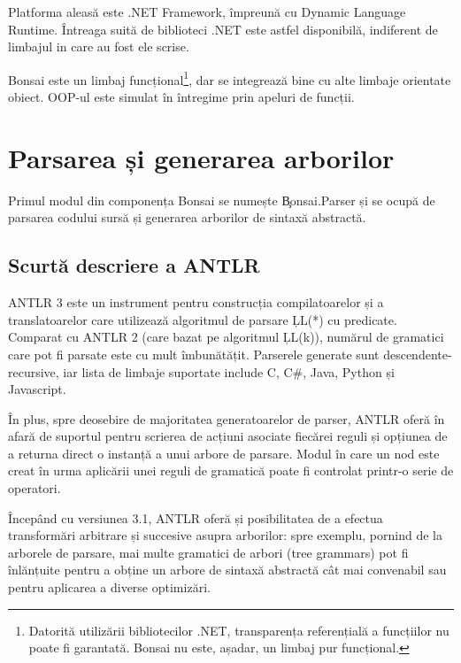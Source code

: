 \documentclass[12pt,a4paper]{memoir}
\begin{document}
Platforma aleasă este .NET Framework, împreună cu Dynamic Language Runtime. Întreaga suită de biblioteci .NET este astfel disponibilă, indiferent de limbajul in care au fost ele scrise. 

Bonsai este un limbaj funcțional\footnote{Datorită utilizării bibliotecilor .NET, transparența referențială a funcțiilor nu poate fi garantată. Bonsai nu este, așadar, un limbaj pur funcțional.}, dar se integrează bine cu alte limbaje orientate obiect. OOP-ul este simulat în întregime prin apeluri de funcții.

\chapter{Parsarea și generarea arborilor}

Primul modul din componența Bonsai se numește \c{Bonsai.Parser} și se ocupă de parsarea codului sursă și generarea arborilor de sintaxă abstractă.

\section{Scurtă descriere a ANTLR}

ANTLR 3\cite{antlr} este un instrument pentru construcția compilatoarelor și a translatoarelor care utilizează algoritmul de parsare \c{LL(*)} cu predicate\cite{definitive_antlr_reference}. Comparat cu ANTLR 2 (care bazat pe algoritmul \c{LL(k)}), numărul de gramatici care pot fi parsate este cu mult îmbunătățit. Parserele generate sunt descendente-recursive, iar lista de limbaje suportate\cite{antlr_targets} include C, C\#, Java, Python și Javascript. 

În plus, spre deosebire de majoritatea generatoarelor de parser, ANTLR oferă în afară de suportul pentru scrierea de acțiuni asociate fiecărei reguli și opțiunea de a returna direct o instanță a unui arbore de parsare. Modul în care un nod este creat în urma aplicării unei reguli de gramatică poate fi controlat printr-o serie de operatori\cite{antlr_book_treeconstruction}.

Începând cu versiunea 3.1, ANTLR oferă și posibilitatea de a efectua transformări arbitrare și succesive asupra arborilor: spre exemplu, pornind de la arborele de parsare, mai multe gramatici de arbori (tree grammars) pot fi înlănțuite pentru a obține un arbore de sintaxă abstractă cât mai convenabil sau pentru aplicarea a diverse optimizări\cite{antlr_tree_grammars}\cite{antlr_book_treegrammars}.
\end{document}

